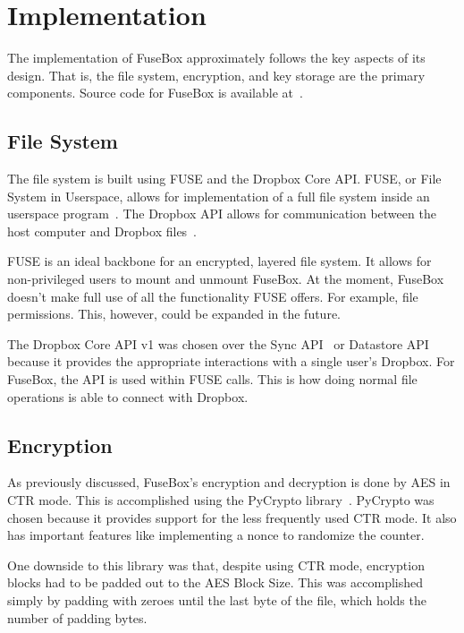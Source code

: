 \documentclass[11pt,twocolumn,letterpaper]{article}
\newcommand{\appname}{FuseBox }
\newcommand{\appnameWOspace}{FuseBox}
\begin{document}
\section{Implementation}
\label{sec:implementation}
The implementation of \appname approximately follows the key aspects
of its design. That is, the file system, encryption, and key storage
are the primary components. Source code for \appname is available at~\cite{FuseBox}.

\subsection{File System}
\label{sec:fsimp}
The file system is built using FUSE and the Dropbox Core
API. FUSE, or File System in Userspace, allows for implementation of a
full file system inside an userspace program~\cite{fuse}. The Dropbox
API allows for communication between the host computer and Dropbox
files~\cite{dropboxcore}.
\par FUSE is an ideal backbone for an encrypted, layered file system. It allows
for non-privileged users to mount and unmount \appnameWOspace. At the
moment, \appname doesn't make full use of all the functionality FUSE
offers. For example, file permissions. This, however, could be expanded in the future. 
\par The Dropbox Core API v1 was chosen over the Sync API~\cite{dropboxsync} or Datastore
API~\cite{dropboxdatastore} because it provides the appropriate interactions with a single
user's Dropbox. For \appnameWOspace, the API is used within FUSE
calls. This is how doing normal file operations is able to connect
with Dropbox. 

\subsection{Encryption}
\label{sec:encimp}
As previously discussed, \appnameWOspace's encryption and decryption
is done by AES in CTR mode. This is accomplished using the  PyCrypto
library~\cite{pycrypto}.
PyCrypto was chosen because it provides support for the less
frequently used CTR
mode. It also has important features like implementing a nonce to
randomize the counter. 
\par One downside to this library was that, despite using CTR mode,
encryption blocks had to be padded out to the AES Block Size. This was
accomplished simply by padding with zeroes until the last byte of the
file, which holds the number of padding bytes.  
\end{document}
